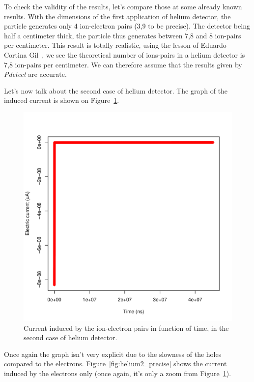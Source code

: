 \documentclass[11pt]{article}
\begin{document}
				To check the validity of the results, let's compare those at some already known results.
				With the dimensions of the first application of helium detector, the particle generates only 4 ion-electron pairs
				(3,9 to be precise). The detector being half a centimeter thick, the particle thus generates between 7,8 and 8
				ion-pairs per centimeter. This result is totally realistic, using the lesson of Eduardo Cortina Gil~\cite{lphy2236},
				we see the theoretical number of ions-pairs in a helium detector is 7,8 ion-pairs per centimeter. We can therefore
				assume that the results given by \textit{Pdetect} are accurate.

				Let's now talk about the second case of helium detector. The graph of the induced current is shown on
				Figure~\ref{fig:helium2_unprecise}.

				\begin{figure}[H]
				  \center
				  \includegraphics[scale=0.4]{images/applications/helium2_unprecise.pdf}
				  \caption{Current induced by the ion-electron pairs in function of time, in the second case of helium detector.}
				  \label{fig:helium2_unprecise}
				\end{figure}

				Once again the graph isn't very explicit due to the slowness of the holes compared to the electrons.
				Figure~\ref{fig:helium2_precise} shows the current induced by the electrons only (once again, it's only
				a zoom from Figure~\ref{fig:helium2_unprecise}).
\end{document}
